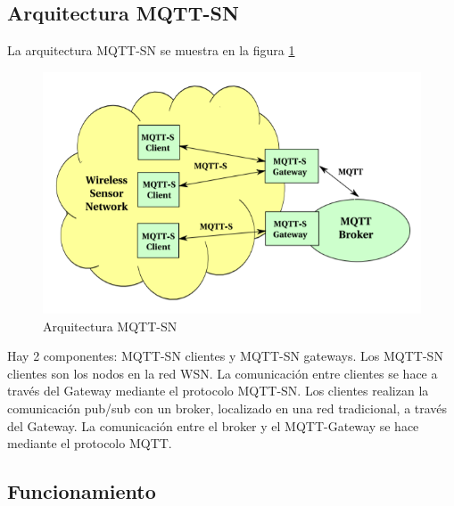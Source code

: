 \documentclass[12pt, twoside]{book}
\begin{document}
\subsection{Arquitectura MQTT-SN}
La arquitectura MQTT-SN se muestra en la figura \ref{L412}
\begin{figure}[H]
\centering
\includegraphics[scale=0.5]{images/mqttsn}
\caption{Arquitectura MQTT-SN}\label{L412}
\end{figure}
Hay 2 componentes: MQTT-SN clientes y MQTT-SN gateways. Los MQTT-SN clientes son los nodos en la red WSN. La comunicación entre clientes se hace a través del Gateway mediante el protocolo MQTT-SN. Los clientes realizan la comunicación pub/sub con un broker, localizado en una red tradicional, a través del Gateway. La comunicación entre el broker y el MQTT-Gateway se hace mediante el protocolo MQTT.
\subsection{Funcionamiento}  
\end{document}
